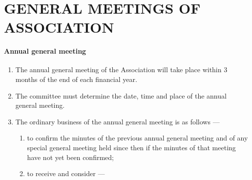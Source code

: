 \documentclass[../constitution.tex]{subfiles}
\begin{document}
\hypertarget{part-6-general-meetings-of-association}{%
\part{GENERAL MEETINGS OF ASSOCIATION}\label{part-6-general-meetings-of-association}}

\hypertarget{annual-general-meeting}{%
\subsection{Annual general meeting}\label{annual-general-meeting}}

\begin{enumerate}

\item The annual general meeting of the Association will take place within 3 months of the end of each financial year.
\item The committee must determine the date, time and place of the annual general meeting.
\item The ordinary business of the annual general meeting is as follows ---

  \begin{enumerate}
  
  \item to confirm the minutes of the previous annual general meeting and of any special general meeting held since then if the minutes of that meeting have not yet been confirmed;
  \item to receive and consider ---

    \begin{enumerate}
    

\end{enumerate}
\end{enumerate}
\end{enumerate}
\end{document}

